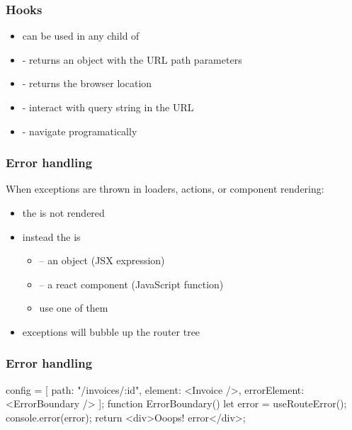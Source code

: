 \begin{frame}[fragile] \frametitle{Hooks}
\begin{itemize}
  \item can be used in any child of 
  \item {} - returns an object with the URL path parameters
  \item {} - returns the browser location
  \item {} - interact with query string in the URL
  \item {} - navigate programatically
\end{itemize}
\end{frame}

\begin{frame}[fragile] \frametitle{Error handling}
When exceptions are thrown in loaders, actions, or component rendering:
\begin{itemize}
  \item the  is not rendered
  \item instead the  is
  \begin{itemize}
    \item {} -- an object (JSX expression)
    \item {} -- a react component (JavaScript function)
    \item use one of them
  \end{itemize}
  \item exceptions will bubble up the router tree 
\end{itemize}
\end{frame}
\begin{frame}[fragile] \frametitle{Error handling}
\begin{CodeBox}{}
config = [{
  path: "/invoices/:id",
  element: <Invoice />,
  errorElement: <ErrorBoundary />
}];
function ErrorBoundary() {
  let error = useRouteError();
  console.error(error);
  return <div>Ooops! {error}</div>;
}
\end{CodeBox}
\end{frame}



